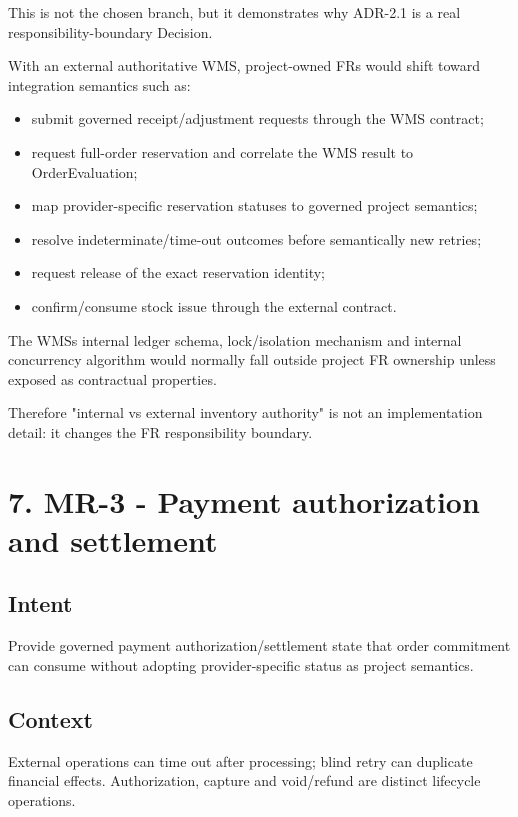 \documentclass[
  10pt,
]{article}
\providecommand{\tightlist}{%
  \setlength{\itemsep}{0pt}\setlength{\parskip}{0pt}}
\begin{document}
This is not the chosen branch, but it demonstrates why ADR-2.1 is a real
responsibility-boundary Decision.

With an external authoritative WMS, project-owned FRs would shift toward
integration semantics such as:

\begin{itemize}
\tightlist
\item
  submit governed receipt/adjustment requests through the WMS contract;
\item
  request full-order reservation and correlate the WMS result to
  OrderEvaluation;
\item
  map provider-specific reservation statuses to governed project
  semantics;
\item
  resolve indeterminate/time-out outcomes before semantically new
  retries;
\item
  request release of the exact reservation identity;
\item
  confirm/consume stock issue through the external contract.
\end{itemize}

The WMS\textquotesingle s internal ledger schema, lock/isolation
mechanism and internal concurrency algorithm would normally fall outside
project FR ownership unless exposed as contractual properties.

Therefore "internal vs external inventory authority" is not an
implementation detail: it changes the FR responsibility boundary.

\section{7. MR-3 - Payment authorization and
settlement}\label{7-mr-3---payment-authorization-and-settlement}

\subsection{Intent}\label{intent-2}

Provide governed payment authorization/settlement state that order
commitment can consume without adopting provider-specific status as
project semantics.

\subsection{Context}\label{context-2}

External operations can time out after processing; blind retry can
duplicate financial effects. Authorization, capture and void/refund are
distinct lifecycle operations.
\end{document}
